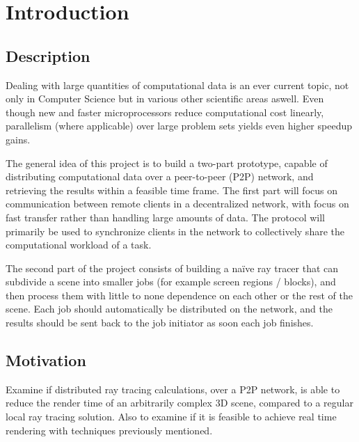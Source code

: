 \chapter{Introduction}
 
\section{Description}

Dealing with large quantities of computational data is an ever current topic, not only in Computer Science but in various other scientific areas aswell. Even though new and faster microprocessors reduce computational cost linearly, parallelism (where applicable) over large problem sets yields even higher speedup gains. 


The general idea of this project is to build a two-part prototype, capable of distributing computational data over a peer-to-peer (P2P) network, and retrieving the results within a feasible time frame. The first part will focus on communication between remote clients in a decentralized network, with focus on fast transfer rather than handling large amounts of data. The protocol will primarily be used to synchronize clients in the network to collectively share the computational workload of a task. 

The second part of the project consists of building a naïve ray tracer that can subdivide a scene into smaller jobs (for example screen regions / blocks), and then process them with little to none dependence on each other or the rest of the scene. Each job should automatically be distributed on the network, and the results should be sent back to the job initiator as soon each job finishes.

\section{Motivation}
Examine if distributed ray tracing calculations, over a P2P network, is able to reduce the render time of an arbitrarily complex 3D scene, compared to a regular local ray tracing solution. Also to examine if it is feasible to achieve real time rendering with techniques previously mentioned.
 